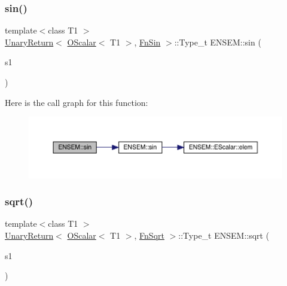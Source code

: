 \mbox{\label{group__obsscalar_ga2f881a4ba6a085af64243caa93001f49}} 
\subsubsection{\texorpdfstring{sin()}{sin()}}
{\footnotesize\ttfamily template$<$class T1 $>$ \\
\mbox{\hyperlink{structENSEM_1_1UnaryReturn}{Unary\+Return}}$<$ \mbox{\hyperlink{classENSEM_1_1OScalar}{O\+Scalar}}$<$ T1 $>$, \mbox{\hyperlink{structENSEM_1_1FnSin}{Fn\+Sin}} $>$\+::Type\+\_\+t E\+N\+S\+E\+M\+::sin (\begin{DoxyParamCaption}\item[{const \mbox{\hyperlink{classENSEM_1_1OScalar}{O\+Scalar}}$<$ T1 $>$ \&}]{s1 }\end{DoxyParamCaption})\hspace{0.3cm}{\ttfamily [inline]}}

Here is the call graph for this function\+:\nopagebreak
\begin{figure}[H]
\begin{center}
\leavevmode
\includegraphics[width=350pt]{d1/d71/group__obsscalar_ga2f881a4ba6a085af64243caa93001f49_cgraph}
\end{center}
\end{figure}
\mbox{\label{group__obsscalar_ga8b8e13d0f31d513ae7c36827f65c0c61}} 
\subsubsection{\texorpdfstring{sqrt()}{sqrt()}}
{\footnotesize\ttfamily template$<$class T1 $>$ \\
\mbox{\hyperlink{structENSEM_1_1UnaryReturn}{Unary\+Return}}$<$ \mbox{\hyperlink{classENSEM_1_1OScalar}{O\+Scalar}}$<$ T1 $>$, \mbox{\hyperlink{structENSEM_1_1FnSqrt}{Fn\+Sqrt}} $>$\+::Type\+\_\+t E\+N\+S\+E\+M\+::sqrt (\begin{DoxyParamCaption}\item[{const \mbox{\hyperlink{classENSEM_1_1OScalar}{O\+Scalar}}$<$ T1 $>$ \&}]{s1 }\end{DoxyParamCaption})\hspace{0.3cm}{\ttfamily [inline]}}

